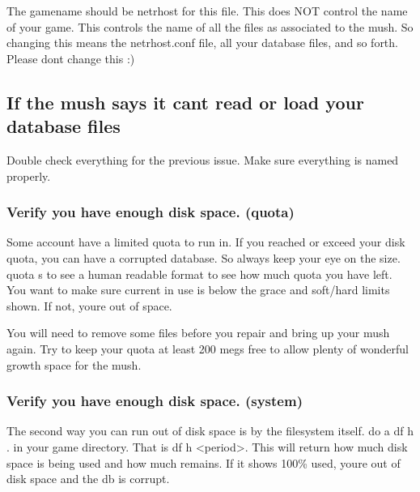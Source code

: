 \documentclass[letterpaper,10pt,english]{sphinxmanual}
\begin{document}
\sphinxAtStartPar
The gamename should be \textquotesingle{}netrhost\textquotesingle{} for this file.  This does NOT control
the name of your game.  This controls the name of all the files
as associated to the mush.  So changing this means the netrhost.conf
file, all your database files, and so forth.  Please don\textquotesingle{}t change this :)


\subsection{If the mush says it can\textquotesingle{}t read or load your database files}
\label{\detokenize{troubleshooting:if-the-mush-says-it-can-t-read-or-load-your-database-files}}
\sphinxAtStartPar
Double check everything for the previous issue. Make sure everything is named properly.


\subsubsection{Verify you have enough disk space. (quota)}
\label{\detokenize{troubleshooting:verify-you-have-enough-disk-space-quota}}
\sphinxAtStartPar
Some account have a limited quota to run in.  If you reached or exceed
your disk quota, you can have a corrupted database.  So always keep
your eye on the size.  quota \sphinxhyphen{}s to see a human readable format to see
how much quota you have left.  You want to make sure current in use is
below the \textquotesingle{}grace\textquotesingle{} and soft/hard limits shown.  If not, you\textquotesingle{}re out of
space.

\sphinxAtStartPar
You will need to remove some files before you repair and bring up your
mush again.  Try to keep your quota at least 200 megs free to allow
plenty of wonderful growth space for the mush.


\subsubsection{Verify you have enough disk space.  (system)}
\label{\detokenize{troubleshooting:verify-you-have-enough-disk-space-system}}
\sphinxAtStartPar
The second way you can run out of disk space is by the filesystem itself.
do a df \sphinxhyphen{}h . in your \textquotesingle{}game\textquotesingle{} directory\textquotesingle{}.  That is df \sphinxhyphen{}h \textless{}period\textgreater{}.
This will return how much disk space is being used and how much remains.
If it shows 100\% used, you\textquotesingle{}re out of disk space and the db is corrupt.
\end{document}
